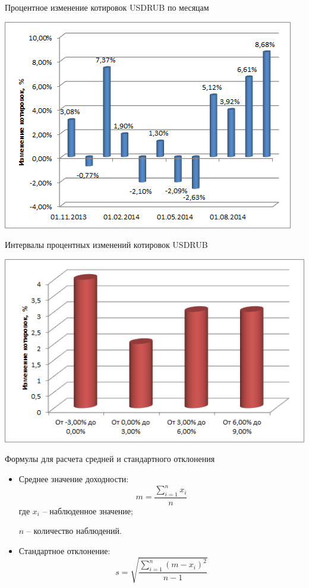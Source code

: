 \documentclass[_fin_decisions_lectures.tex]{subfiles}
\begin{document}
\begin{frame}{Процентное изменение котировок USDRUB по месяцам}
\begin{center}
\includegraphics[scale=0.8]{img/usdrubdeltaperc}
\end{center}
\end{frame}
\begin{frame}{Интервалы процентных изменений котировок  USDRUB}
\begin{center}
\includegraphics[scale=0.8]{img/usdrubquotesintervals}
\end{center}
\end{frame}
\begin{frame}{Формулы для расчета средней и стандартного отклонения}
\begin{itemize}[<+->]
\item
Среднее значение доходности:
$$m=\frac{\sum_{i=1}^n x_i}{n}$$
где $x_i$ – наблюденное значение;

$n$ – количество наблюдений.
\item
Стандартное отклонение:
$$s=\sqrt{\frac{\sum_{i=1}^n (m-x_i)^2}{n-1}}$$
\end{itemize}
\end{frame}
\end{document}
